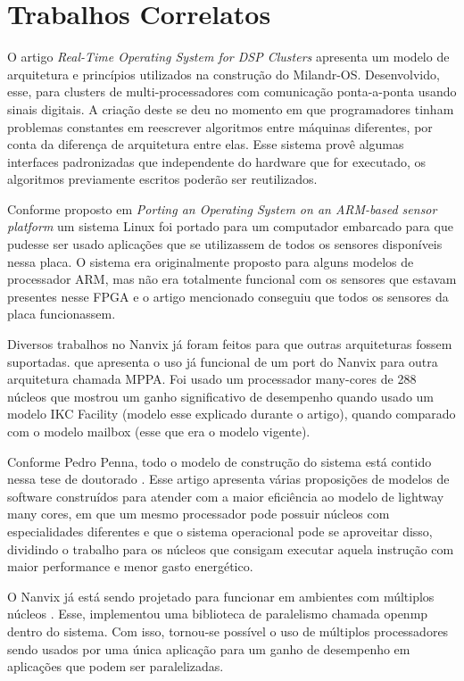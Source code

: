 \section{Trabalhos Correlatos}

O artigo \emph{Real-Time Operating System for DSP Clusters} \cite{Drozdov2015RealTimeOS} apresenta um modelo de arquitetura e princípios utilizados na construção
do Milandr-OS. Desenvolvido, esse, para clusters de multi-processadores com comunicação ponta-a-ponta usando sinais digitais. A criação deste se deu no momento em
que programadores tinham problemas constantes em reescrever algoritmos entre máquinas diferentes, por conta da diferença de arquitetura entre elas. Esse sistema
provê algumas interfaces padronizadas que independente do hardware que for executado, os algoritmos previamente escritos poderão ser reutilizados.

Conforme proposto em \emph{Porting an Operating System on an ARM-based sensor platform} \cite{7372829} um sistema Linux foi portado para um computador embarcado para
que pudesse ser usado aplicações que se utilizassem de todos os sensores disponíveis nessa placa. O sistema era originalmente proposto para alguns modelos de processador
ARM, mas não era totalmente funcional com os sensores que estavam presentes nesse FPGA e o artigo mencionado conseguiu que todos os sensores da placa funcionassem.

Diversos trabalhos no Nanvix já foram feitos para que outras arquiteturas fossem suportadas. \cite{PENNA20211} que apresenta o uso já funcional de um port do 
Nanvix para outra arquitetura chamada MPPA. Foi usado um processador many-cores de 288 núcleos que mostrou um ganho significativo de desempenho quando usado um 
modelo IKC Facility (modelo esse explicado durante o artigo), quando comparado com o modelo mailbox (esse que era o modelo vigente).

Conforme Pedro Penna, todo o modelo de construção do sistema está contido nessa tese de doutorado \cite{penna:tel-03545212}. Esse artigo apresenta várias proposições 
de modelos de software construídos para atender com a maior eficiência ao modelo de lightway many cores, em que um mesmo processador pode possuir núcleos com especialidades 
diferentes e que o sistema operacional pode se aproveitar disso, dividindo o trabalho para os núcleos que consigam executar aquela instrução com maior performance e menor 
gasto energético.

O Nanvix já está sendo projetado para funcionar em ambientes com múltiplos núcleos \cite{MSC-Reinaldo}. Esse, implementou uma biblioteca de paralelismo chamada 
openmp dentro do sistema. Com isso, tornou-se possível o uso de múltiplos processadores sendo usados por uma única aplicação para um ganho de desempenho em aplicações 
que podem ser paralelizadas.

